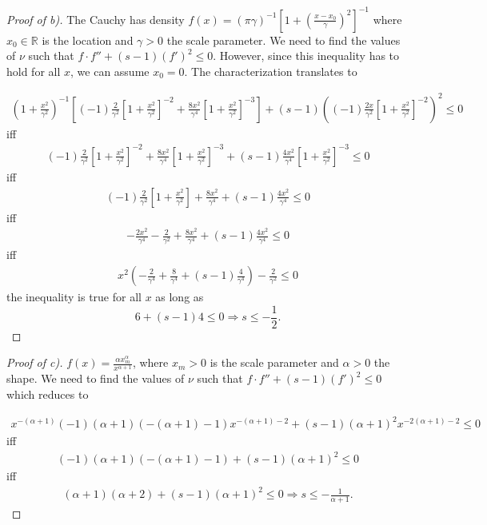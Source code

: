 \documentclass{article} %
\begin{document}
\begin{proof}[Proof of b)]
The Cauchy has density $f(x) =(\pi \gamma)^{-1}\left[1+\left(\frac{x-x_0}{\gamma}\right)^2\right]^{-1}$ where $x_0 \in \mathbb{R}$ is the location and $\gamma>0$ the scale parameter. We need to find the values of $\nu$ such that $f \cdot f'' + (s - 1) (f')^2 \leq 0$. However, since this inequality has to hold for all $x$, we can assume $x_0 = 0$. The characterization translates to 

\begin{align*}
\left(1+\frac{x^2}{\gamma^2}\right)^{-1}\left[(-1)\frac{2}{\gamma^2} \left[ 1+ \frac{x^2}{\gamma^2}\right]^{-2}+\frac{8x^2}{\gamma^4} \left[ 1+ \frac{x^2}{\gamma^2}\right]^{-3}\right]+(s -1) \left( (-1)\frac{2x}{\gamma^2} \left[ 1+ \frac{x^2}{\gamma^2}\right]^{-2} \right)^2 \leq 0    
\end{align*}
iff
\begin{align*}
(-1)\frac{2}{\gamma^2} \left[ 1+ \frac{x^2}{\gamma^2}\right]^{-2}+\frac{8x^2}{\gamma^4} \left[ 1+ \frac{x^2}{\gamma^2}\right]^{-3}+(s -1) \frac{4x^2}{\gamma^4} \left[ 1+ \frac{x^2}{\gamma^2}\right]^{-3}  \leq 0    
\end{align*}
iff
\begin{align*}
(-1)\frac{2}{\gamma^2} \left[ 1+ \frac{x^2}{\gamma^2}\right]+\frac{8x^2}{\gamma^4}+(s -1) \frac{4x^2}{\gamma^4} \leq 0    
\end{align*}
iff
\begin{align*}
-\frac{2x^2}{\gamma^4}-\frac{2}{\gamma^2}+\frac{8x^2}{\gamma^4}+(s -1) \frac{4x^2}{\gamma^4} \leq 0    
\end{align*}
iff
\begin{align*}
x^2\left(-\frac{2}{\gamma^4}+\frac{8}{\gamma^4}+(s -1) \frac{4}{\gamma^4}\right) -\frac{2}{\gamma^2} \leq 0    
\end{align*}
the inequality is true for all $x$ as long as
$$
6+(s-1)4\leq 0 \Rightarrow s \leq -\frac{1}{2}.
$$
\end{proof}

\begin{proof}[Proof of c)]
$f(x) = \frac{\alpha x_{m}^\alpha}{x^{\alpha+1}}$, where $x_m>0$ is the scale parameter and $\alpha>0$ the shape. We need to find the values of $\nu$ such that $f \cdot f'' + (s - 1) (f')^2 \leq 0$ which reduces to 

\begin{align*}
x^{-(\alpha +1 )}(-1)(\alpha +1 )(-(\alpha +1 ) -1) x^{-(\alpha +1 ) -2 }+(s - 1)(\alpha +1 )^2 x^{-2(\alpha +1 ) -2 } \leq 0
\end{align*}
iff
\begin{align*}
(-1)(\alpha +1 )(-(\alpha +1 ) -1) +(s - 1)(\alpha +1 )^2  \leq 0
\end{align*}
iff
\begin{align*}
(\alpha +1 )(\alpha +2) +(s - 1)(\alpha +1 )^2  \leq 0 \Rightarrow s \leq -\frac{1}{\alpha + 1}.
\end{align*}

\end{proof}
\end{document}
